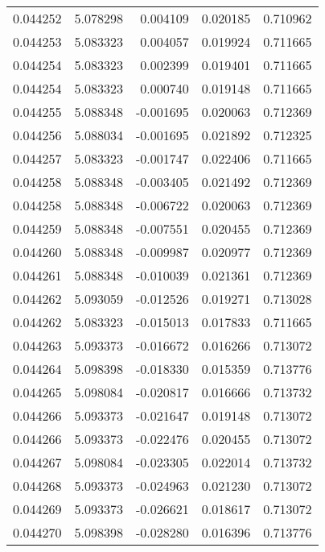 \begin{tabular}{lrrrr}
0.044252    &  5.078298 &  0.004109 &  0.020185 &             0.710962 \\
0.044253    &  5.083323 &  0.004057 &  0.019924 &             0.711665 \\
0.044254    &  5.083323 &  0.002399 &  0.019401 &             0.711665 \\
0.044254    &  5.083323 &  0.000740 &  0.019148 &             0.711665 \\
0.044255    &  5.088348 & -0.001695 &  0.020063 &             0.712369 \\
0.044256    &  5.088034 & -0.001695 &  0.021892 &             0.712325 \\
0.044257    &  5.083323 & -0.001747 &  0.022406 &             0.711665 \\
0.044258    &  5.088348 & -0.003405 &  0.021492 &             0.712369 \\
0.044258    &  5.088348 & -0.006722 &  0.020063 &             0.712369 \\
0.044259    &  5.088348 & -0.007551 &  0.020455 &             0.712369 \\
0.044260    &  5.088348 & -0.009987 &  0.020977 &             0.712369 \\
0.044261    &  5.088348 & -0.010039 &  0.021361 &             0.712369 \\
0.044262    &  5.093059 & -0.012526 &  0.019271 &             0.713028 \\
0.044262    &  5.083323 & -0.015013 &  0.017833 &             0.711665 \\
0.044263    &  5.093373 & -0.016672 &  0.016266 &             0.713072 \\
0.044264    &  5.098398 & -0.018330 &  0.015359 &             0.713776 \\
0.044265    &  5.098084 & -0.020817 &  0.016666 &             0.713732 \\
0.044266    &  5.093373 & -0.021647 &  0.019148 &             0.713072 \\
0.044266    &  5.093373 & -0.022476 &  0.020455 &             0.713072 \\
0.044267    &  5.098084 & -0.023305 &  0.022014 &             0.713732 \\
0.044268    &  5.093373 & -0.024963 &  0.021230 &             0.713072 \\
0.044269    &  5.093373 & -0.026621 &  0.018617 &             0.713072 \\
0.044270    &  5.098398 & -0.028280 &  0.016396 &             0.713776 \\

\end{tabular}
